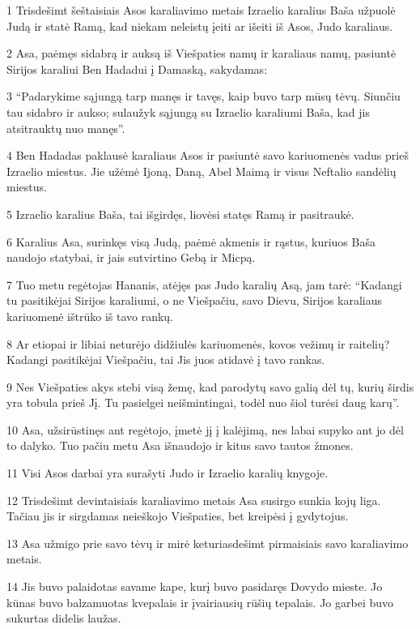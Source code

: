 \par 1 Trisdešimt šeštaisiais Asos karaliavimo metais Izraelio karalius Baša užpuolė Judą ir statė Ramą, kad niekam neleistų įeiti ar išeiti iš Asos, Judo karaliaus. 
\par 2 Asa, paėmęs sidabrą ir auksą iš Viešpaties namų ir karaliaus namų, pasiuntė Sirijos karaliui Ben Hadadui į Damaską, sakydamas: 
\par 3 “Padarykime sąjungą tarp manęs ir tavęs, kaip buvo tarp mūsų tėvų. Siunčiu tau sidabro ir aukso; sulaužyk sąjungą su Izraelio karaliumi Baša, kad jis atsitrauktų nuo manęs”. 
\par 4 Ben Hadadas paklausė karaliaus Asos ir pasiuntė savo kariuomenės vadus prieš Izraelio miestus. Jie užėmė Ijoną, Daną, Abel Maimą ir visus Neftalio sandėlių miestus. 
\par 5 Izraelio karalius Baša, tai išgirdęs, liovėsi statęs Ramą ir pasitraukė. 
\par 6 Karalius Asa, surinkęs visą Judą, paėmė akmenis ir rąstus, kuriuos Baša naudojo statybai, ir jais sutvirtino Gebą ir Micpą. 
\par 7 Tuo metu regėtojas Hananis, atėjęs pas Judo karalių Asą, jam tarė: “Kadangi tu pasitikėjai Sirijos karaliumi, o ne Viešpačiu, savo Dievu, Sirijos karaliaus kariuomenė ištrūko iš tavo rankų. 
\par 8 Ar etiopai ir libiai neturėjo didžiulės kariuomenės, kovos vežimų ir raitelių? Kadangi pasitikėjai Viešpačiu, tai Jis juos atidavė į tavo rankas. 
\par 9 Nes Viešpaties akys stebi visą žemę, kad parodytų savo galią dėl tų, kurių širdis yra tobula prieš Jį. Tu pasielgei neišmintingai, todėl nuo šiol turėsi daug karų”. 
\par 10 Asa, užsirūstinęs ant regėtojo, įmetė jį į kalėjimą, nes labai supyko ant jo dėl to dalyko. Tuo pačiu metu Asa išnaudojo ir kitus savo tautos žmones. 
\par 11 Visi Asos darbai yra surašyti Judo ir Izraelio karalių knygoje. 
\par 12 Trisdešimt devintaisiais karaliavimo metais Asa susirgo sunkia kojų liga. Tačiau jis ir sirgdamas neieškojo Viešpaties, bet kreipėsi į gydytojus. 
\par 13 Asa užmigo prie savo tėvų ir mirė keturiasdešimt pirmaisiais savo karaliavimo metais. 
\par 14 Jis buvo palaidotas savame kape, kurį buvo pasidaręs Dovydo mieste. Jo kūnas buvo balzamuotas kvepalais ir įvairiausių rūšių tepalais. Jo garbei buvo sukurtas didelis laužas.




